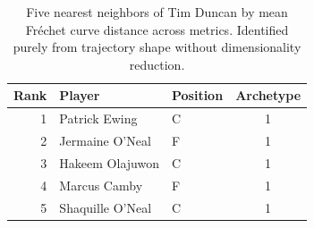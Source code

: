 \begin{table}[htbp]
  \centering\small
  \begin{tabular}{rllc}
    \toprule
    Rank & Player & Position & Archetype \\
    \midrule
    1 & Patrick Ewing & C & 1 \\
    2 & Jermaine O'Neal & F & 1 \\
    3 & Hakeem Olajuwon & C & 1 \\
    4 & Marcus Camby & F & 1 \\
    5 & Shaquille O'Neal & C & 1 \\
    \bottomrule
  \end{tabular}
  \caption{Five nearest neighbors of Tim Duncan by mean Fr\'{e}chet curve distance across metrics. Identified purely from trajectory shape without dimensionality reduction.}
  \label{tab:Tim_Duncan_frechet_curve_neighbors}
\end{table}

